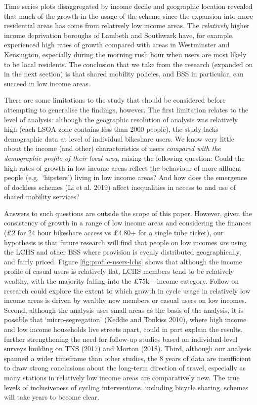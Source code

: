 \documentclass[
]{article}
\begin{document}
Time series plots disaggregated by income decile and geographic location revealed that much of the growth in the usage of the scheme since the expansion into more residential areas has come from relatively low income areas.
The \emph{relatively} higher income deprivation boroughs of Lambeth and Southwark have, for example, experienced high rates of growth compared with areas in Westminster and Kensington, especially during the morning rush hour when users are most likely to be local residents.
The conclusion that we take from the research (expanded on in the next section) is that shared mobility policies, and BSS in particular, can succeed in low income areas.

There are some limitations to the study that should be considered before attempting to generalise the findings, however.
The first limitation relates to the level of analysis: although the geographic resolution of analysis was relatively high (each LSOA zone contains less than 2000 people), the study lacks demographic data at level of individual bikeshare users.
We know very little about the income (and other) characteristics of users \emph{compared with the demographic profile of their local area}, raising the following question:
Could the high rates of growth in low income areas reflect the behaviour of more affluent people (e.g.~`hipsters') living in low income areas?
And how does the emergence of dockless schemes (Li et al. 2019) affect inequalities in access to and use of shared mobility services?

Answers to such questions are outside the scope of this paper.
However, given the consistency of growth in a range of low income areas and considering the finances (£2 for 24 hour bikeshare access vs £4.80+ for a single tube ticket), our hypothesis is that future research will find that people on low incomes \emph{are} using the LCHS and other BSS where provision is evenly distributed geographically, and fairly priced.
Figure \ref{fig:profile-users-lchs} shows that although the income profile of casual users is relatively flat, LCHS members tend to be relatively wealthy, with the majority falling into the £75k+ income category.
Follow-on research could explore the extent to which growth in cycle usage in relatively low income areas is driven by wealthy new members or casual users on low incomes.
Second, although the analysis uses small areas as the basis of the analysis, it is possible that `micro-segregation' (Keddie and Tonkiss 2010), where high income and low income households live streets apart, could in part explain the results, further strengthening the need for follow-up studies based on individual-level surveys building on TNS (2017) and Morton (2018).
Third, although our analysis spanned a wider timeframe than other studies, the 8 years of data are insufficient to draw strong conclusions about the long-term direction of travel, especially as many stations in relatively low income areas are comparatively new.
The true levels of inclusiveness of cycling interventions, including bicycle sharing, schemes will take years to become clear.
\end{document}

